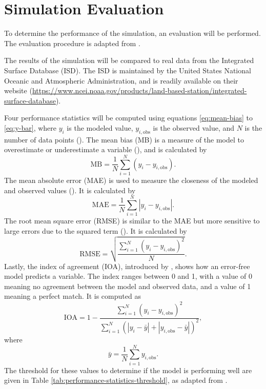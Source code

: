 \section{Simulation Evaluation}
	To determine the performance of the simulation, an evaluation will be performed. The evaluation procedure is adapted from \textcite{Bilang2022}.
	
	The results of the simulation will be compared to real data from the Integrated Surface Database (ISD).
	The ISD is maintained by the United States National Oceanic and Atmospheric Administration, and is readily available on their website 
		(\url{https://www.ncei.noaa.gov/products/land-based-station/integrated-surface-database}).
	
	Four performance statistics will be computed using equations \ref{eq:mean-bias} to \ref{eq:y-bar},
		where $y_i$ is the modeled value, $y_{i,\text{obs}}$ is the observed value, and $N$ is the number of data points (\cite{Bilang2022}).
	The mean bias (MB) is a measure of the model to overestimate or underestimate a variable (\cite{Carbonell2013}), and is calculated by
	\begin{equation}
		\text{MB} =
			\frac{1}{N}
			\sum_{i=1}^{N}
			(y_i - y_{i,\text{obs}}).
			\label{eq:mean-bias}
	\end{equation}
	The mean absolute error (MAE) is used to measure the closeness of the modeled and observed values (\cite{Arasa2016}).
	It is calculated by
	\begin{equation}
		\text{MAE} =
			\frac{1}{N}
			\sum_{i=1}^{N} 
			|y_i - y_{i,\text{obs}}|. \label{eq:mean-absolute-error}
	\end{equation}
	The root mean square error (RMSE) is similar to the MAE but more sensitive to large errors due to the squared term (\cite{Carbonell2013}).
	It is calculated by
	\begin{equation}
		\text{RMSE} =
		\sqrt{
			\frac{
				\sum_{i=1}^{N}
				(y_i - y_{i,\text{obs}}) ^ 2
			}{N}
		}.
		\label{eq:root-mean-square-error}
	\end{equation}
	Lastly, the index of agreement (IOA), introduced by \textcite{Willmott1980}, shows how an error-free model predicts a variable.
	The index ranges between \num{0} and \num{1},
		with a value of \num{0} meaning no agreement between the model and observed data,
		and a value of \num{1} meaning a perfect match. 
	It is computed as
	\begin{equation}
		\text{IOA} =
			1 - 
			\frac{
				\sum_{i=1}^{N}
				(y_i - y_{i,\text{obs}}) ^ 2
			}{
				\sum_{i=1}^{N} (
					|y_i - \bar{y}| +
					|y_{i,\text{obs}} - \bar{y}|
				)^2
			},
			\label{eq:index-of-agreement}
	\end{equation}
	where
	\begin{equation}
		\bar{y} = 
			\frac{1}{N}
			\sum_{i=1}^{N} y_{i,\text{obs}}.
			\label{eq:y-bar}
	\end{equation}
	The threshold for these values to determine if the model is performing well are given in Table \ref{tab:performance-statistics-threshold}, as adapted from \textcite{Bilang2022}.

